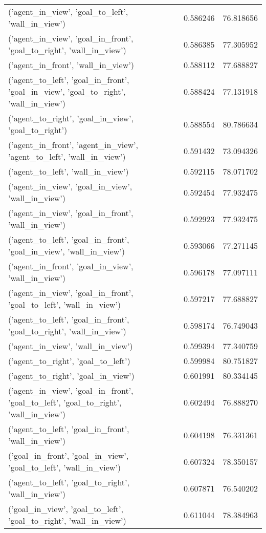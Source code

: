 \begin{tabular}{lrr}
('agent\_in\_view', 'goal\_to\_left', 'wall\_in\_view') & 0.586246 & 76.818656 \\
('agent\_in\_view', 'goal\_in\_front', 'goal\_to\_right', 'wall\_in\_view') & 0.586385 & 77.305952 \\
('agent\_in\_front', 'wall\_in\_view') & 0.588112 & 77.688827 \\
('agent\_to\_left', 'goal\_in\_front', 'goal\_in\_view', 'goal\_to\_right', 'wall\_in\_view') & 0.588424 & 77.131918 \\
('agent\_to\_right', 'goal\_in\_view', 'goal\_to\_right') & 0.588554 & 80.786634 \\
('agent\_in\_front', 'agent\_in\_view', 'agent\_to\_left', 'wall\_in\_view') & 0.591432 & 73.094326 \\
('agent\_to\_left', 'wall\_in\_view') & 0.592115 & 78.071702 \\
('agent\_in\_view', 'goal\_in\_view', 'wall\_in\_view') & 0.592454 & 77.932475 \\
('agent\_in\_view', 'goal\_in\_front', 'wall\_in\_view') & 0.592923 & 77.932475 \\
('agent\_to\_left', 'goal\_in\_front', 'goal\_in\_view', 'wall\_in\_view') & 0.593066 & 77.271145 \\
('agent\_in\_front', 'goal\_in\_view', 'wall\_in\_view') & 0.596178 & 77.097111 \\
('agent\_in\_view', 'goal\_in\_front', 'goal\_to\_left', 'wall\_in\_view') & 0.597217 & 77.688827 \\
('agent\_to\_left', 'goal\_in\_front', 'goal\_to\_right', 'wall\_in\_view') & 0.598174 & 76.749043 \\
('agent\_in\_view', 'wall\_in\_view') & 0.599394 & 77.340759 \\
('agent\_to\_right', 'goal\_to\_left') & 0.599984 & 80.751827 \\
('agent\_to\_right', 'goal\_in\_view') & 0.601991 & 80.334145 \\
('agent\_in\_view', 'goal\_in\_front', 'goal\_to\_left', 'goal\_to\_right', 'wall\_in\_view') & 0.602494 & 76.888270 \\
('agent\_to\_left', 'goal\_in\_front', 'wall\_in\_view') & 0.604198 & 76.331361 \\
('goal\_in\_front', 'goal\_in\_view', 'goal\_to\_left', 'wall\_in\_view') & 0.607324 & 78.350157 \\
('agent\_to\_left', 'goal\_to\_right', 'wall\_in\_view') & 0.607871 & 76.540202 \\
('goal\_in\_view', 'goal\_to\_left', 'goal\_to\_right', 'wall\_in\_view') & 0.611044 & 78.384963 \\

\end{tabular}

